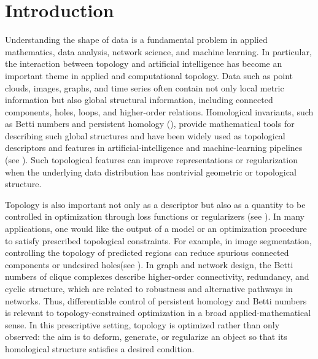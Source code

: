 \documentclass[pdflatex,sn-mathphys-ay]{sn-jnl}%
\theoremstyle{thmstyleone}%
\theoremstyle{thmstyletwo}%
\theoremstyle{thmstylethree}%
\begin{document}
\section{Introduction}

Understanding the shape of data is a fundamental problem in applied mathematics, data analysis, network science, and machine learning.
In particular, the interaction between topology and artificial intelligence has become an important theme in applied and computational topology.
Data such as point clouds, images, graphs, and time series often contain not only local metric information but also global structural information, including connected components, holes, loops, and higher-order relations. Homological invariants, such as Betti numbers and persistent homology (\cite{edelsbrunner2002topological,zomorodian2004computing,cohen2005stability,edelsbrunner2008persistent,otter2017roadmap}), provide mathematical tools for describing such global structures and have been widely used as topological descriptors and features in artificial-intelligence and machine-learning pipelines (see \cite{adams2017persistence,hofer2017deep,bubenik2020persistence,chazal2014stochastic,kalivsnik2019tropical}).
Such topological features can improve representations or regularization when the underlying data distribution has nontrivial geometric or topological structure.

Topology is also important not only as a descriptor but also as a quantity to be controlled in optimization through loss functions or regularizers (see \cite{moor2020topological,vandaele2021topologically,gabrielsson2020topology}).
In many applications, one would like the output of a model or an optimization procedure to satisfy prescribed topological constraints. For example, in image segmentation, controlling the topology of predicted regions can reduce spurious connected components or undesired holes(see \cite{clough2020topological,hu2019topology}). In graph and network design, the Betti numbers of clique complexes describe higher-order connectivity, redundancy, and cyclic structure, which are related to robustness and alternative pathways in networks. Thus, differentiable control of persistent homology and Betti numbers is relevant to topology-constrained optimization in a broad applied-mathematical sense.
In this prescriptive setting, topology is optimized rather than only observed: the aim is to deform, generate, or regularize an object so that its homological structure satisfies a desired condition.
\end{document}

